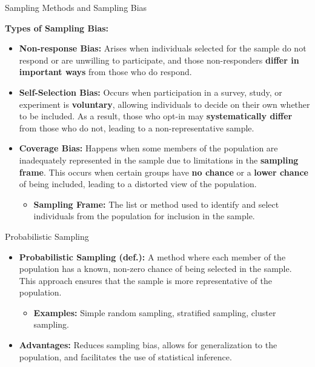 \documentclass[handout]{beamer} %
\begin{document}
\begin{frame}{Sampling Methods and Sampling Bias}

    \textbf{Types of Sampling Bias:}
    \begin{itemize}
        \item \textbf{Non-response Bias:}
        Arises when individuals selected for the sample do not respond or are unwilling to participate, and those non-responders \textbf{differ in important ways} from those who do respond. \pause %

        \item \textbf{Self-Selection Bias:}
        Occurs when participation in a survey, study, or experiment is \textbf{voluntary}, allowing individuals to decide on their own whether to be included. As a result, those who opt-in may \textbf{systematically differ} from those who do not, leading to a non-representative sample. \pause

        \item \textbf{Coverage Bias:}
        Happens when some members of the population are inadequately represented in the sample due to limitations in the \textbf{sampling frame}. This occurs when certain groups have \textbf{no chance} or a \textbf{lower chance} of being included, leading to a distorted view of the population.
        \begin{itemize}
            \item \textbf{Sampling Frame:} The list or method used to identify and select individuals from the population for inclusion in the sample.
        \end{itemize}
    \end{itemize}

\end{frame}





\begin{frame}{Probabilistic Sampling}
    \begin{itemize}
        \item \textbf{Probabilistic Sampling (def.):} A method where each member of the population has a known, non-zero chance of being selected in the sample. This approach ensures that the sample is more representative of the population.
        \begin{itemize}
            \item \textbf{Examples:} Simple random sampling, stratified sampling, cluster sampling.
        \end{itemize}

        \item \textbf{Advantages:} Reduces sampling bias, allows for generalization to the population, and facilitates the use of statistical inference.
    \end{itemize}

\end{frame}
\end{document}
